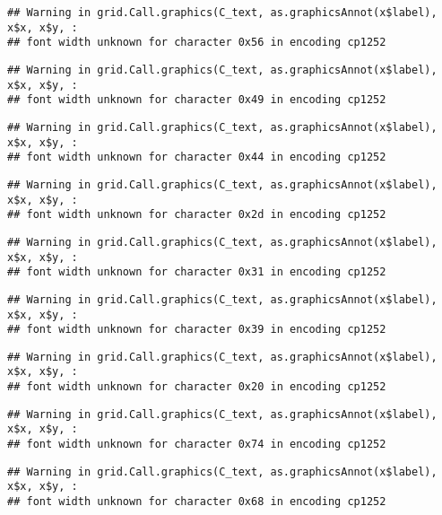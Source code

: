 \documentclass[
]{article}
\begin{document}
\begin{verbatim}
## Warning in grid.Call.graphics(C_text, as.graphicsAnnot(x$label), x$x, x$y, :
## font width unknown for character 0x56 in encoding cp1252
\end{verbatim}

\begin{verbatim}
## Warning in grid.Call.graphics(C_text, as.graphicsAnnot(x$label), x$x, x$y, :
## font width unknown for character 0x49 in encoding cp1252
\end{verbatim}

\begin{verbatim}
## Warning in grid.Call.graphics(C_text, as.graphicsAnnot(x$label), x$x, x$y, :
## font width unknown for character 0x44 in encoding cp1252
\end{verbatim}

\begin{verbatim}
## Warning in grid.Call.graphics(C_text, as.graphicsAnnot(x$label), x$x, x$y, :
## font width unknown for character 0x2d in encoding cp1252
\end{verbatim}

\begin{verbatim}
## Warning in grid.Call.graphics(C_text, as.graphicsAnnot(x$label), x$x, x$y, :
## font width unknown for character 0x31 in encoding cp1252
\end{verbatim}

\begin{verbatim}
## Warning in grid.Call.graphics(C_text, as.graphicsAnnot(x$label), x$x, x$y, :
## font width unknown for character 0x39 in encoding cp1252
\end{verbatim}

\begin{verbatim}
## Warning in grid.Call.graphics(C_text, as.graphicsAnnot(x$label), x$x, x$y, :
## font width unknown for character 0x20 in encoding cp1252
\end{verbatim}

\begin{verbatim}
## Warning in grid.Call.graphics(C_text, as.graphicsAnnot(x$label), x$x, x$y, :
## font width unknown for character 0x74 in encoding cp1252
\end{verbatim}

\begin{verbatim}
## Warning in grid.Call.graphics(C_text, as.graphicsAnnot(x$label), x$x, x$y, :
## font width unknown for character 0x68 in encoding cp1252
\end{verbatim}
\end{document}
